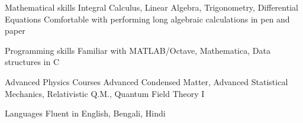 

\begin{cvskills}


  
  \cvskill
	{Mathematical skills} %
	{Integral Calculus, Linear Algebra, Trigonometry, Differential Equations}
  \cvskill
	{}
	{Comfortable with performing long algebraic calculations in pen and paper} %

  \cvskill
    {Programming skills} %
    {Familiar with MATLAB/Octave, Mathematica, Data structures in C} %

  \cvskill
{Advanced Physics Courses} %
{Advanced Condensed Matter, Advanced Statistical Mechanics, Relativistic Q.M., Quantum Field Theory I} %

  \cvskill
    {Languages} %
    {Fluent in English, Bengali, Hindi} %

\end{cvskills}
